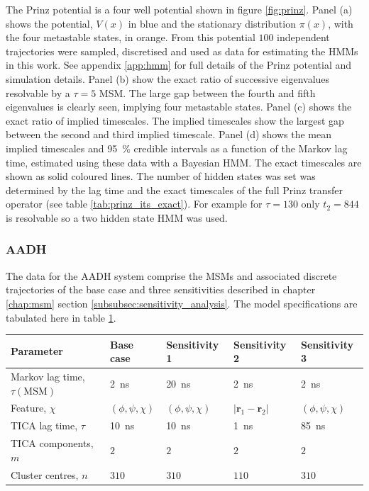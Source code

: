 The Prinz potential \cite{prinzMarkovModelsMolecular2011} is a four well potential shown in figure \ref{fig:prinz}.  Panel (a) shows the potential, $V(x)$ in blue and the stationary distribution $\pi(x)$, with the four metastable states, in orange. From this potential  $100$ independent trajectories were sampled, discretised and used as data for estimating the HMMs in this work. See appendix \ref{app:hmm} for full details of the Prinz potential and simulation details. Panel (b) show the exact ratio of successive eigenvalues resolvable by a $\tau=5$ MSM. The large gap between the fourth and fifth eigenvalues is clearly seen, implying four metastable states. Panel (c) shows the exact ratio of implied timescales. The implied timescales show the largest gap between the second and third implied timescale. Panel (d) shows the mean implied timescales and \SI{95}{\percent} credible intervals as a function of the Markov lag time, estimated using these data with a Bayesian HMM. The exact timescales are shown as solid coloured lines. The number of hidden states was set was determined by the lag time and the exact timescales of the full Prinz transfer operator (see table \ref{tab:prinz_its_exact}). For example for $\tau = 130$ only $t_2 = 844$ is resolvable so a two hidden state HMM was used.

\subsubsection{AADH}
The data for the AADH system comprise the MSMs and associated discrete trajectories of the base case and three sensitivities described in chapter \ref{chap:msm} section \ref{subsubsec:sensitivity_analysis}. The model specifications are tabulated here in table \ref{tab:aadh_final_msm_specs}. 

\begin{table}
    \centering
    \begin{tabular}{|l|l|l|l|l|}
        \hline
        Parameter & Base case & Sensitivity 1 & Sensitivity 2 & Sensitivity 3 \\
        \hline\hline
        Markov lag time, $\tau(\textrm{MSM})$ & \SI{2}{\nano\second} &  \SI{20}{\nano\second}& \SI{2}{\nano\second}& \SI{2}{\nano\second} \\
        Feature, $\chi$ & $(\phi, \psi, \chi)$ & $(\phi, \psi, \chi)$ & $|\mathbf{r}_{1}-\mathbf{r}_2|$ & $(\phi, \psi, \chi)$ \\
        TICA lag time, $\tau$ & \SI{10}{\nano\second} & \SI{10}{\nano\second}&\SI{1}{\nano\second} &\SI{85}{\nano\second} \\
        TICA components, $m$ & $2$ & $2$ & $2$ & $2$ \\
        Cluster centres, $n$ & $310$ & $310$ & $110$ & $310$ \\
        \hline
    \end{tabular}
    \label{tab:aadh_final_msm_specs}
\end{table}

